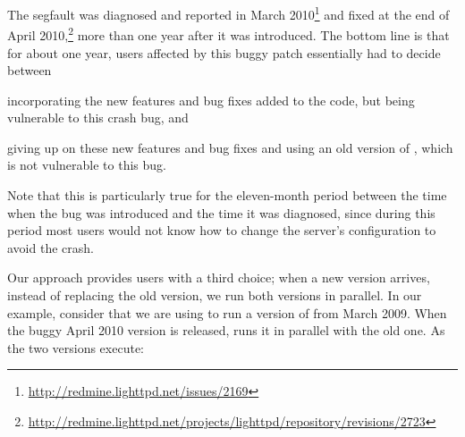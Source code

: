 The segfault was diagnosed and reported in March
2010\footnote{\url{http://redmine.lighttpd.net/issues/2169}} and fixed
at the end of April
2010,\footnote{\url{http://redmine.lighttpd.net/projects/lighttpd/repository/revisions/2723}}
more than one year after it was introduced.  
The bottom line is
that for about one year, users affected by this buggy patch
essentially had to decide between%
\begin{inparaenum}[(1)]
\item incorporating the new features
and bug fixes added to the code, but being vulnerable to this crash
bug, and
\item giving up on these new features and bug fixes and using
an old version of \lighttpd, which is not vulnerable to this bug.
\end{inparaenum}
Note that this is particularly true for the eleven-month period
between the time when the bug was introduced and the time it was
diagnosed, since during this period most users would not know how to
change the server's configuration to avoid the crash.



Our approach provides users with a third choice; when a new version
arrives, instead of replacing the old version, we run both versions in
parallel. In our example, consider that we are using \mx to run a
version of \lighttpd from March 2009.  When the buggy April 2010 version
is released, \mx runs it in parallel with the old one.  As the two
versions execute:

